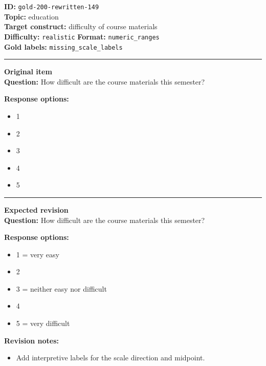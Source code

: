 \documentclass[10pt,a4paper]{article}
\newcommand{\sectionline}{\vspace{0.15em}\hrule\vspace{0.35em}}
\begin{document}
\begin{tcolorbox}[colframe=FlawRed,colback=white,colbacktitle=FlawRed!9,coltitle=black,title={Item 149\hfill Flawed item}]
\textbf{ID:} \texttt{gold-200-rewritten-149}\\
\textbf{Topic:} education\\
\textbf{Target construct:} difficulty of course materials\\
\textbf{Difficulty:} \texttt{realistic} \quad \textbf{Format:} \texttt{numeric\_ranges}\\
\textbf{Gold labels:} \texttt{missing\_scale\_labels}\\
\sectionline
\textbf{Original item}\\
\textbf{Question:} How difficult are the course materials this semester?
\par\textbf{Response options:}
\begin{itemize}
\item 1
\item 2
\item 3
\item 4
\item 5
\end{itemize}
\sectionline
\textbf{Expected revision}\\
\textbf{Question:} How difficult are the course materials this semester?
\par\textbf{Response options:}
\begin{itemize}
\item 1 = very easy
\item 2
\item 3 = neither easy nor difficult
\item 4
\item 5 = very difficult
\end{itemize}
\par\textbf{Revision notes:}
\begin{itemize}
\item Add interpretive labels for the scale direction and midpoint.
\end{itemize}
\end{tcolorbox}
\end{document}
